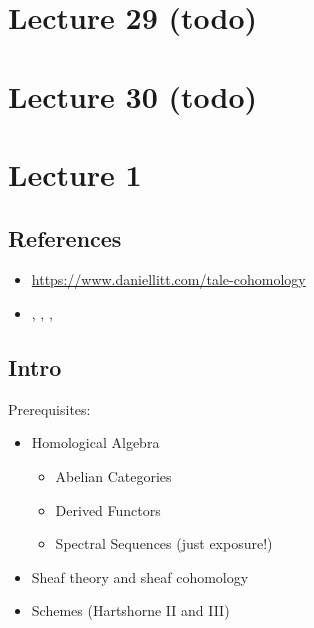 \hypertarget{lecture-29-todo}{%
\section{Lecture 29 (todo)}\label{lecture-29-todo}}

\hypertarget{lecture-30-todo}{%
\section{Lecture 30 (todo)}\label{lecture-30-todo}}

\hypertarget{lecture-1-1}{%
\section{Lecture 1}\label{lecture-1-1}}

\hypertarget{references-1}{%
\subsection{References}\label{references-1}}

\begin{itemize}
\tightlist
\item
  \url{https://www.daniellitt.com/tale-cohomology}
\item
  \autocite{milneLEC}, \autocite{milne_2017},
  \autocite{freitag_kiehl_2013}, \autocite{katz}
\end{itemize}

\hypertarget{intro-1}{%
\subsection{Intro}\label{intro-1}}

Prerequisites:

\begin{itemize}
\tightlist
\item
  Homological Algebra

  \begin{itemize}
  \tightlist
  \item
    Abelian Categories
  \item
    Derived Functors
  \item
    Spectral Sequences (just exposure!)
  \end{itemize}
\item
  Sheaf theory and sheaf cohomology
\item
  Schemes (Hartshorne II and III)
\end{itemize}

